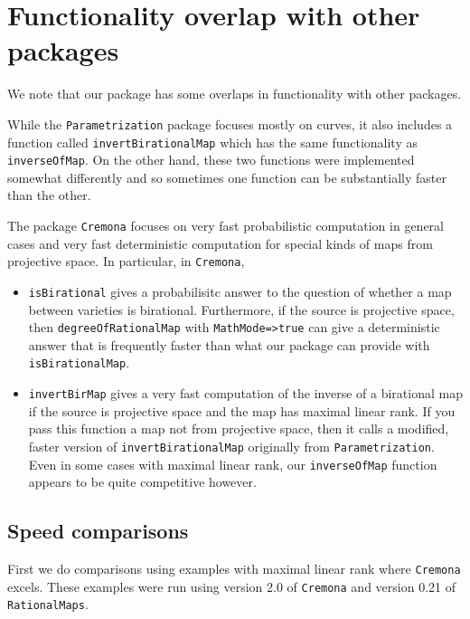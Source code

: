 \documentclass[11pt]{amsart}
\numberwithin{equation}{theorem}
\renewcommand{\:}{\colon}
\theoremstyle{theorem}
\begin{document}
{\color{black}\normalsize
\section{Functionality overlap with other packages}

We note that our package has some overlaps in functionality with other packages.

While the {\tt Parametrization} package focuses mostly on curves, it also includes a function called {\tt invertBirationalMap} which has the same functionality as {\tt inverseOfMap}. On the other hand, these two functions were implemented somewhat differently and so sometimes one function can be substantially faster than the other.

The package {\tt Cremona} focuses on very fast probabilistic computation in general cases and very fast deterministic computation for special kinds of maps from projective space. In particular, in {\tt Cremona},

\begin{itemize}
\item{}     {\tt isBirational} gives a probabilisitc answer to the question of whether a map between varieties is birational. Furthermore, if the source is projective space, then {\tt degreeOfRationalMap} with {\tt MathMode=>true} can give a deterministic answer that is frequently faster than what our package can provide with {\tt isBirationalMap}.
\item{}  {\tt invertBirMap} gives a very fast computation of the inverse of a birational map if the source is projective space and the map has maximal linear rank. If you pass this function a map not from projective space, then it calls a modified, faster version of {\tt invertBirationalMap} originally from {\tt Parametrization}. Even in some cases with maximal linear rank, our {\tt inverseOfMap} function appears to be quite competitive however.
\end{itemize}

\subsection{Speed comparisons}
\noindent
First we do comparisons using examples with maximal linear rank where {\tt Cremona} excels.  These examples were run using version 2.0 of {\tt Cremona} and version 0.21 of {\tt RationalMaps}.

}
\end{document}
